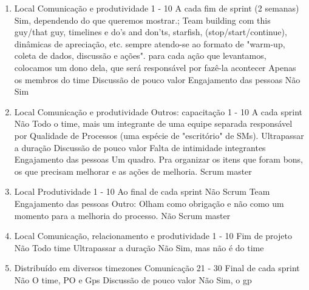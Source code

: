 \begin{enumerate}[leftmargin=0em]
	\item
	\begin{respostas2}
		{Local}
		{Comunicação e produtividade}
		{1 - 10}
		{A cada fim de sprint (2 semanas)}
		{Sim, dependendo do que queremos mostrar.; Team building com this guy/that guy, timelines e do's and don'ts, starfish, (stop/start/continue), dinâmicas de apreciação, etc. sempre atendo-se ao formato de "warm-up, coleta de dados, discussão e ações". para cada ação que levantamos, colocamos um dono dela, que será responsável por fazê-la acontecer}
		{Apenas os membros do time}
		{Discussão de pouco valor \newline Engajamento das pessoas}
		{Não}
		{Sim}
	\end{respostas2}

	\item
	\begin{respostas2}
		{Local}
		{Comunicação e produtividade \newline Outros: capacitação}
		{1 - 10}
		{A cada sprint}
		{Não}
		{Todo o time, mais um integrante de uma equipe separada responsável por Qualidade de Processos (uma espécie de "escritório" de SMs).}
		{Ultrapassar a duração \newline Discussão de pouco valor \newline Falta de intimidade integrantes \newline Engajamento das pessoas}
		{Um quadro. Pra organizar os itens que foram bons, os que precisam melhorar e as ações de melhoria.}
		{Scrum master}
	\end{respostas2}

	\item
	\begin{respostas2}
		{Local}
		{Produtividade}
		{1 - 10}
		{Ao final de cada sprint}
		{Não}
		{Scrum Team}
		{Engajamento das pessoas \newline Outro: Olham como obrigação e não como um momento para a melhoria do processo.}
		{Não}
		{Scrum master}
	\end{respostas2}

	\item
	\begin{respostas2}
		{Local}
		{Comunicação, relacionamento e produtividade}
		{1 - 10}
		{Fim de projeto}
		{Não}
		{Todo time}
		{Ultrapassar a duração}
		{Não}
		{Sim, mas não é do time}
	\end{respostas2}

	\item
	\begin{respostas2}
		{Distribuído em diversos timezones}
		{Comunicação}
		{21 - 30}
		{Final de cada sprint}
		{Não}
		{O time, PO e Gps}
		{Discussão de pouco valor}
		{Não}
		{Sim, o gp}
	\end{respostas2}


\end{enumerate}
